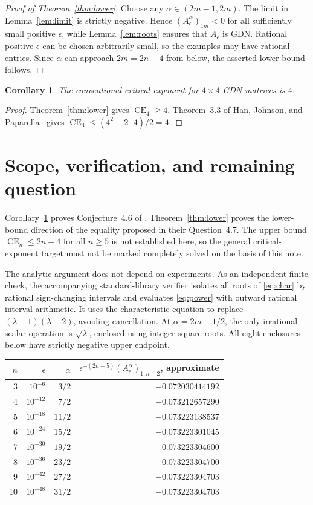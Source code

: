 \documentclass[11pt]{article}
\newtheorem{corollary}[theorem]{Corollary}
\newcommand{\CE}{\operatorname{CE}}
\begin{document}
\begin{proof}[Proof of Theorem~\ref{thm:lower}]
Choose any $\alpha\in(2m-1,2m)$. The limit in Lemma~\ref{lem:limit} is strictly negative. Hence $(A_\epsilon^\alpha)_{1m}<0$ for all sufficiently small positive $\epsilon$, while Lemma~\ref{lem:roots} ensures that $A_\epsilon$ is GDN. Rational positive $\epsilon$ can be chosen arbitrarily small, so the examples may have rational entries. Since $\alpha$ can approach $2m=2n-4$ from below, the asserted lower bound follows.
\end{proof}

\begin{corollary}\label{cor:ce4}
The conventional critical exponent for $4\times4$ GDN matrices is $4$.
\end{corollary}
\begin{proof}
Theorem~\ref{thm:lower} gives $\CE_4\ge4$. Theorem~3.3 of Han, Johnson, and Paparella~\cite{HJP} gives $\CE_4\le(4^2-2\cdot4)/2=4$.
\end{proof}

\section{Scope, verification, and remaining question}
Corollary~\ref{cor:ce4} proves Conjecture~4.6 of \cite{HJP}. Theorem~\ref{thm:lower} proves the lower-bound direction of the equality proposed in their Question~4.7. The upper bound $\CE_n\le2n-4$ for all $n\ge5$ is not established here, so the general critical-exponent target must not be marked completely solved on the basis of this note.

The analytic argument does not depend on experiments. As an independent finite check, the accompanying standard-library verifier isolates all roots of \eqref{eq:char} by rational sign-changing intervals and evaluates \eqref{eq:power} with outward rational interval arithmetic. It uses the characteristic equation to replace $(\lambda-1)(\lambda-2)$, avoiding cancellation. At $\alpha=2m-1/2$, the only irrational scalar operation is $\sqrt\lambda$, enclosed using integer square roots. All eight enclosures below have strictly negative upper endpoint.

\begin{center}
\begin{tabular}{@{}rrrr@{}}\toprule
$n$ & $\epsilon$ & $\alpha$ & $\epsilon^{-(2n-5)}(A_\epsilon^\alpha)_{1,n-2}$, approximate\\\midrule
3 & $10^{-6}$  & $3/2$  & $-0.072030414192$\\
4 & $10^{-12}$ & $7/2$  & $-0.073212657290$\\
5 & $10^{-18}$ & $11/2$ & $-0.073223138537$\\
6 & $10^{-24}$ & $15/2$ & $-0.073223301045$\\
7 & $10^{-30}$ & $19/2$ & $-0.073223304600$\\
8 & $10^{-36}$ & $23/2$ & $-0.073223304700$\\
9 & $10^{-42}$ & $27/2$ & $-0.073223304703$\\
10& $10^{-48}$ & $31/2$ & $-0.073223304703$\\\bottomrule
\end{tabular}
\end{center}
\end{document}
